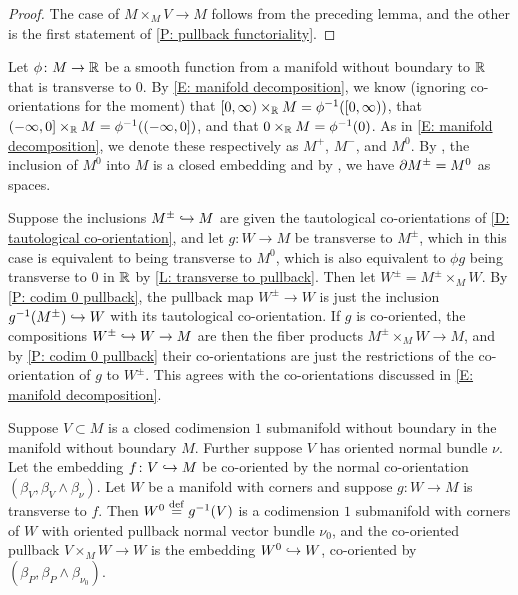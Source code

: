 \begin{proof}
	The case of $M \times_M V \to M$ follows from the preceding lemma, and the other is the first statement of \cref{P: pullback functoriality}.
\end{proof}

\begin{example}\label{E: codim 0 and 1 co-or as fiber products}
	Let $\phi \colon M \to \mathbb{R}$ be a smooth function from a manifold without boundary to $\mathbb{R}$ that is transverse to $0$.
	By \cref{E: manifold decomposition}, we know (ignoring co-orientations for the moment) that $[0,\infty) \times_{\mathbb{R}} M = \phi^{-1}([0,\infty))$, that $(-\infty,0] \times_{\mathbb{R}} M = \phi^{-1}((-\infty,0])$, and that $0 \times_{\mathbb{R}} M = \phi^{-1}(0)$.
	As in \cref{E: manifold decomposition}, we denote these respectively as $M^+$, $M^-$, and $M^0$.
	By \cite[Proposition 4.2.9]{MaDo92}, the inclusion of $M^0$ into $M$ is a closed embedding and by \cite[Proposition 6.7]{Joy12}, we have $\partial M^\pm = M^0$ as spaces.

	Suppose the inclusions $M^\pm \hookrightarrow M$ are given the tautological co-orientations of \cref{D: tautological co-orientation}, and let $g \colon W \to M$ be transverse to $M^\pm$, which in this case is equivalent to being transverse to $M^0$, which is also equivalent to $\phi g$ being transverse to $0$ in $\mathbb{R}$ by \cref{L: transverse to pullback}.
	Then let $W^\pm = M^\pm \times_M W$.
	By \cref{P: codim 0 pullback}, the pullback map $W^\pm \to W$ is just the inclusion $g^{-1}(M^\pm) \hookrightarrow W$ with its tautological co-orientation.
	If $g$ is co-oriented, the compositions $W^\pm \hookrightarrow W \to M$ are then the fiber products $M^\pm \times_M W \to M$, and by \cref{P: codim 0 pullback} their co-orientations are just the restrictions of the co-orientation of $g$ to $W^\pm$.
	This agrees with the co-orientations discussed in \cref{E: manifold decomposition}.
\end{example}

\begin{proposition}\label{P: codim 1 co-orient}
	Suppose $V \subset M$ is a closed codimension $1$ submanifold without boundary in the manifold without boundary $M$.
	Further suppose $V$ has oriented normal bundle $\nu$.
	Let the embedding $f \colon V \hookrightarrow M$ be co-oriented by the normal co-orientation $(\beta_V, \beta_V \wedge \beta_\nu)$.
	Let $W$ be a manifold with corners and suppose $g \colon W \to M$ is transverse to $f$.
	Then $W^0 \stackrel{\mathrm{def}}{=} g^{-1}(V)$ is a codimension $1$ submanifold with corners of $W$ with oriented pullback normal vector bundle $\nu_0$, and the co-oriented pullback $V \times_M W \to W$ is the embedding $W^0 \hookrightarrow W$, co-oriented by $(\beta_P, \beta_P \wedge \beta_{\nu_0})$.
\end{proposition}

